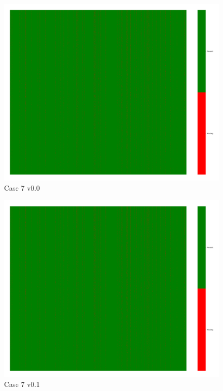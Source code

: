 \documentclass[a4paper,12pt]{article}
\begin{document}
\begin{figure}[H]
    \includegraphics[width=\linewidth]{case8_v0.0_heatmap_cleaned.png}
    \caption*{Case 7 v0.0}
\end{figure}

\begin{figure}[H]
    \includegraphics[width=\linewidth]{case8_v0.1_heatmap_cleaned.png}
    \caption*{Case 7 v0.1}
\end{figure}
\end{document}
